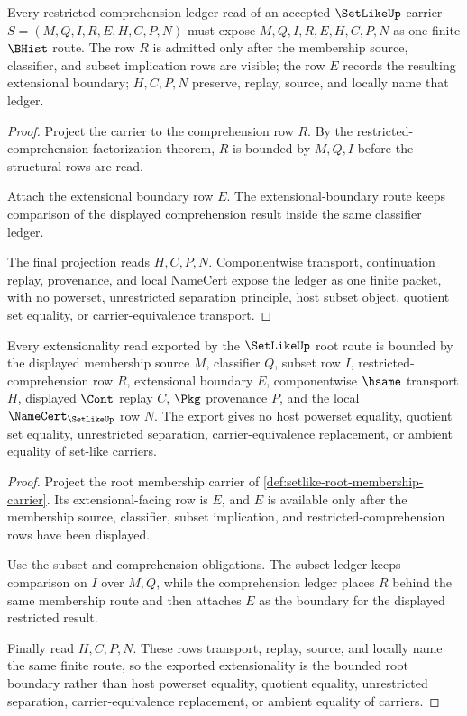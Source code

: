 \begin{theorem}
\label{thm:setlike-comprehension-ledger-obligation}
Every restricted-comprehension ledger read of an accepted $\SetLikeUp$ carrier $S=(M,Q,I,R,E,H,C,P,N)$ must expose $M,Q,I,R,E,H,C,P,N$ as one finite $\BHist$ route. The row $R$ is admitted only after the membership source, classifier, and subset implication rows are visible; the row $E$ records the resulting extensional boundary; $H,C,P,N$ preserve, replay, source, and locally name that ledger.
\end{theorem}
\begin{proof}
Project the carrier to the comprehension row $R$. By the restricted-comprehension factorization theorem, $R$ is bounded by $M,Q,I$ before the structural rows are read.

Attach the extensional boundary row $E$. The extensional-boundary route keeps comparison of the displayed comprehension result inside the same classifier ledger.

The final projection reads $H,C,P,N$. Componentwise transport, continuation replay, provenance, and local NameCert expose the ledger as one finite packet, with no powerset, unrestricted separation principle, host subset object, quotient set equality, or carrier-equivalence transport.
\end{proof}

\begin{theorem}
\label{thm:setlike-root-extensional-boundary}
Every extensionality read exported by the $\SetLikeUp$ root route is bounded by the displayed membership source $M$, classifier $Q$, subset row $I$, restricted-comprehension row $R$, extensional boundary $E$, componentwise $\hsame$ transport $H$, displayed $\Cont$ replay $C$, $\Pkg$ provenance $P$, and the local $\NameCert_{\SetLikeUp}$ row $N$. The export gives no host powerset equality, quotient set equality, unrestricted separation, carrier-equivalence replacement, or ambient equality of set-like carriers.
\end{theorem}
\begin{proof}
Project the root membership carrier of \autoref{def:setlike-root-membership-carrier}. Its extensional-facing row is $E$, and $E$ is available only after the membership source, classifier, subset implication, and restricted-comprehension rows have been displayed.

Use the subset and comprehension obligations. The subset ledger keeps comparison on $I$ over $M,Q$, while the comprehension ledger places $R$ behind the same membership route and then attaches $E$ as the boundary for the displayed restricted result.

Finally read $H,C,P,N$. These rows transport, replay, source, and locally name the same finite route, so the exported extensionality is the bounded root boundary rather than host powerset equality, quotient equality, unrestricted separation, carrier-equivalence replacement, or ambient equality of carriers.
\end{proof}

